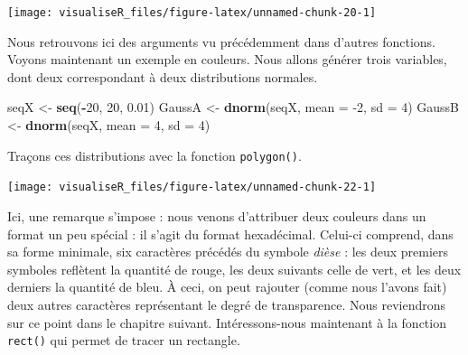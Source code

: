 \documentclass[]{article}
\newenvironment{Shaded}{\begin{snugshade}}{\end{snugshade}}
\newcommand{\DataTypeTok}[1]{\textcolor[rgb]{0.13,0.29,0.53}{#1}}
\newcommand{\DecValTok}[1]{\textcolor[rgb]{0.00,0.00,0.81}{#1}}
\newcommand{\FloatTok}[1]{\textcolor[rgb]{0.00,0.00,0.81}{#1}}
\newcommand{\KeywordTok}[1]{\textcolor[rgb]{0.13,0.29,0.53}{\textbf{#1}}}
\newcommand{\NormalTok}[1]{#1}
\newcommand{\OperatorTok}[1]{\textcolor[rgb]{0.81,0.36,0.00}{\textbf{#1}}}
\newcommand{\StringTok}[1]{\textcolor[rgb]{0.31,0.60,0.02}{#1}}
\begin{document}
\begin{center}\texttt{[image: visualiseR\_files/figure-latex/unnamed-chunk-20-1]} \end{center}

Nous retrouvons ici des arguments vu précédemment dans d'autres fonctions. Voyons maintenant un exemple en couleurs. Nous allons générer trois variables, dont deux correspondant à deux distributions normales.

\begin{Shaded}
\begin{Highlighting}[]
\NormalTok{seqX <-}\StringTok{ }\KeywordTok{seq}\NormalTok{(}\OperatorTok{-}\DecValTok{20}\NormalTok{, }\DecValTok{20}\NormalTok{, }\FloatTok{0.01}\NormalTok{)}
\NormalTok{GaussA <-}\StringTok{ }\KeywordTok{dnorm}\NormalTok{(seqX, }\DataTypeTok{mean =} \DecValTok{-2}\NormalTok{, }\DataTypeTok{sd =} \DecValTok{4}\NormalTok{)}
\NormalTok{GaussB <-}\StringTok{ }\KeywordTok{dnorm}\NormalTok{(seqX, }\DataTypeTok{mean =} \DecValTok{4}\NormalTok{, }\DataTypeTok{sd =} \DecValTok{4}\NormalTok{)}
\end{Highlighting}
\end{Shaded}

Traçons ces distributions avec la fonction \texttt{polygon()}.

\begin{Shaded}
\end{Shaded}

\begin{center}\texttt{[image: visualiseR\_files/figure-latex/unnamed-chunk-22-1]} \end{center}

Ici, une remarque s'impose : nous venons d'attribuer deux couleurs dans un format un peu spécial : il s'agit du format hexadécimal. Celui-ci comprend, dans sa forme minimale, six caractères précédés du symbole \emph{dièse} : les deux premiers symboles reflètent la quantité de rouge, les deux suivants celle de vert, et les deux derniers la quantité de bleu. À ceci, on peut rajouter (comme nous l'avons fait) deux autres caractères représentant le degré de transparence. Nous reviendrons sur ce point dans le chapitre suivant.
Intéressons-nous maintenant à la fonction \texttt{rect()} qui permet de tracer un rectangle.
\end{document}

